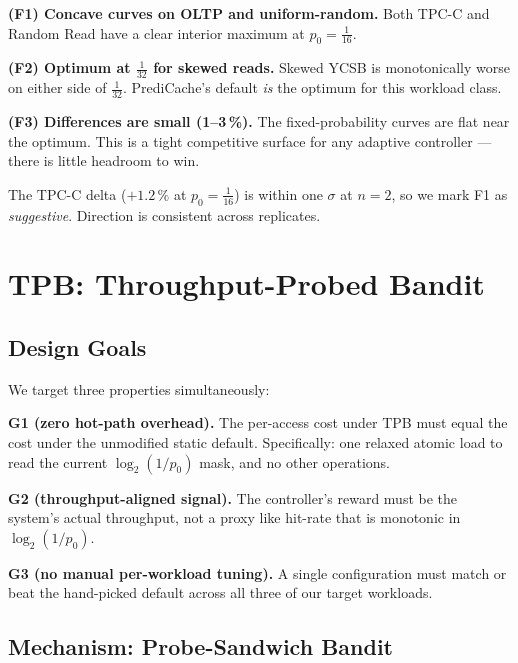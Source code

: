 \documentclass[10pt,twocolumn]{article}
\begin{document}
\textbf{(F1) Concave curves on OLTP and uniform-random.}  Both
TPC-C and Random Read have a clear interior maximum at $p_0\!=\!\tfrac{1}{16}$.

\textbf{(F2) Optimum at $\tfrac{1}{32}$ for skewed reads.}
Skewed YCSB is monotonically worse on either side of $\tfrac{1}{32}$.
PrediCache's default \emph{is} the optimum for this workload class.

\textbf{(F3) Differences are small (1--3\,\%).}  The fixed-probability
curves are flat near the optimum.  This is a tight competitive surface
for any adaptive controller --- there is little headroom to win.

The TPC-C delta ($+1.2\,\%$ at $p_0\!=\!\tfrac{1}{16}$) is within one
$\sigma$ at $n\!=\!2$, so we mark F1 as \emph{suggestive}.  Direction is
consistent across replicates.

\section{TPB: Throughput-Probed Bandit}

\subsection{Design Goals}

We target three properties simultaneously:

\textbf{G1 (zero hot-path overhead).}  The per-access cost under TPB must
equal the cost under the unmodified static default.  Specifically: one
relaxed atomic load to read the current $\log_2(1/p_0)$ mask, and no
other operations.

\textbf{G2 (throughput-aligned signal).}  The controller's reward must
be the system's actual throughput, not a proxy like hit-rate that is
monotonic in $\log_2(1/p_0)$.

\textbf{G3 (no manual per-workload tuning).}  A single configuration
must match or beat the hand-picked default across all three of our
target workloads.

\subsection{Mechanism: Probe-Sandwich Bandit}
\end{document}
